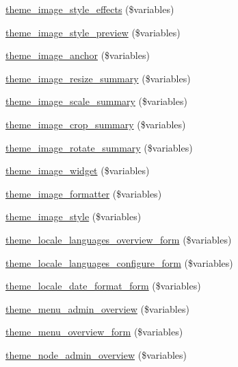 \begin{DoxyCompactItemize}
\item 
\hyperlink{group__themeable_ga1227448c909cd1606cb18928876958f2}{theme\_\-image\_\-style\_\-effects} (\$variables)
\item 
\hyperlink{group__themeable_gadadcabb59ca4f10f98be76d80e224e4a}{theme\_\-image\_\-style\_\-preview} (\$variables)
\item 
\hyperlink{group__themeable_ga87233de46f3d47b3771920125165035d}{theme\_\-image\_\-anchor} (\$variables)
\item 
\hyperlink{group__themeable_ga19f204a2137d1fdd8fe4183a047f94ef}{theme\_\-image\_\-resize\_\-summary} (\$variables)
\item 
\hyperlink{group__themeable_gaed6cfce9b86de8f5c500bf9228134cf5}{theme\_\-image\_\-scale\_\-summary} (\$variables)
\item 
\hyperlink{group__themeable_ga499049d5bb381dd2315dffd36f9a9c43}{theme\_\-image\_\-crop\_\-summary} (\$variables)
\item 
\hyperlink{group__themeable_gae47fb79da2660519fd8f650af8486a59}{theme\_\-image\_\-rotate\_\-summary} (\$variables)
\item 
\hyperlink{group__themeable_ga455134ab57ea615adf71aaa27adf9e75}{theme\_\-image\_\-widget} (\$variables)
\item 
\hyperlink{group__themeable_gac8bbf1cd8217fe56a699148d8713e09e}{theme\_\-image\_\-formatter} (\$variables)
\item 
\hyperlink{group__themeable_ga18305f3777e7a1e9e5ffcf253b39bbd5}{theme\_\-image\_\-style} (\$variables)
\item 
\hyperlink{group__themeable_ga3e850294586d271065fce8ed9bf7af90}{theme\_\-locale\_\-languages\_\-overview\_\-form} (\$variables)
\item 
\hyperlink{group__themeable_gad16df2552ed4113a2043e83502d4aeba}{theme\_\-locale\_\-languages\_\-configure\_\-form} (\$variables)
\item 
\hyperlink{group__themeable_gafc8684caeae65fd531143223aeb5525b}{theme\_\-locale\_\-date\_\-format\_\-form} (\$variables)
\item 
\hyperlink{group__themeable_gaa3f678d076d7ee037013c813d826240c}{theme\_\-menu\_\-admin\_\-overview} (\$variables)
\item 
\hyperlink{group__themeable_gacdf929f3196f98910f9761b46d672767}{theme\_\-menu\_\-overview\_\-form} (\$variables)
\item 
\hyperlink{group__themeable_ga5e362c601057afe19e454d31b708a19e}{theme\_\-node\_\-admin\_\-overview} (\$variables)
\item 

\end{DoxyCompactItemize}
